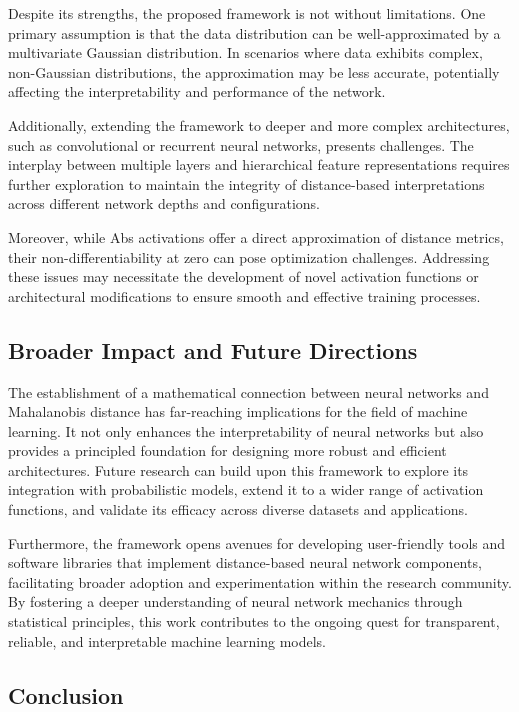 Despite its strengths, the proposed framework is not without limitations. One primary assumption is that the data distribution can be well-approximated by a multivariate Gaussian distribution. In scenarios where data exhibits complex, non-Gaussian distributions, the approximation may be less accurate, potentially affecting the interpretability and performance of the network.

Additionally, extending the framework to deeper and more complex architectures, such as convolutional or recurrent neural networks, presents challenges. The interplay between multiple layers and hierarchical feature representations requires further exploration to maintain the integrity of distance-based interpretations across different network depths and configurations.

Moreover, while Abs activations offer a direct approximation of distance metrics, their non-differentiability at zero can pose optimization challenges. Addressing these issues may necessitate the development of novel activation functions or architectural modifications to ensure smooth and effective training processes.

\subsection{Broader Impact and Future Directions}

The establishment of a mathematical connection between neural networks and Mahalanobis distance has far-reaching implications for the field of machine learning. It not only enhances the interpretability of neural networks but also provides a principled foundation for designing more robust and efficient architectures. Future research can build upon this framework to explore its integration with probabilistic models, extend it to a wider range of activation functions, and validate its efficacy across diverse datasets and applications.

Furthermore, the framework opens avenues for developing user-friendly tools and software libraries that implement distance-based neural network components, facilitating broader adoption and experimentation within the research community. By fostering a deeper understanding of neural network mechanics through statistical principles, this work contributes to the ongoing quest for transparent, reliable, and interpretable machine learning models.

\subsection{Conclusion}

